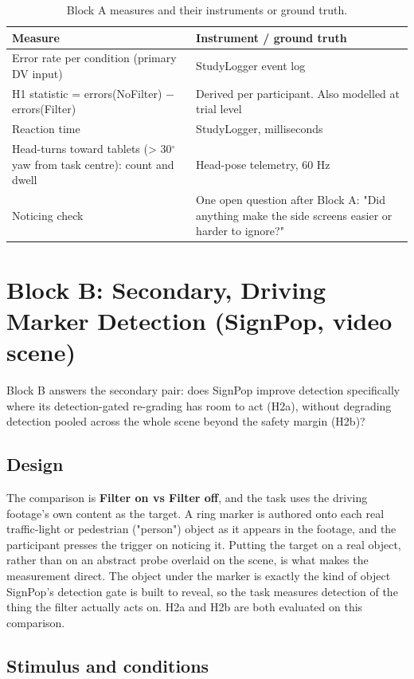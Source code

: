 \begin{longtable}{p{}|p{}}
\caption{Block A measures and their instruments or ground truth.}\\
\hline
\textbf{Measure} & \textbf{Instrument / ground truth} \\
\hline
\endhead
\hline
Error rate per condition (primary DV input) & StudyLogger event log \\
H1 statistic = errors(NoFilter) $-$ errors(Filter) & Derived per participant. Also modelled at trial level \\
Reaction time & StudyLogger, milliseconds \\
Head-turns toward tablets (> 30$^{\circ}$ yaw from task centre): count and dwell & Head-pose telemetry, 60 Hz \\
Noticing check & One open question after Block A: "Did anything make the side screens easier or harder to ignore?" \\
\hline
\end{longtable}

\section{Block B: Secondary, Driving Marker Detection (SignPop, video scene)}

Block B answers the secondary pair: does SignPop improve detection specifically where its
detection-gated re-grading has room to act (H2a), without degrading detection pooled across the whole
scene beyond the safety margin (H2b)?

\subsection{Design}

The comparison is \textbf{Filter on vs Filter off}, and the task uses the driving footage's own
content as the target. A ring marker is authored onto each real traffic-light or pedestrian
("person") object as it appears in the footage, and the participant presses the trigger on noticing
it. Putting the target on a real object, rather than on an abstract probe overlaid on the scene, is
what makes the measurement direct. The object under the marker is exactly the kind of object
SignPop's detection gate is built to reveal, so the task measures detection of the thing the filter
actually acts on. H2a and H2b are both evaluated on this comparison.

\subsection{Stimulus and conditions}

